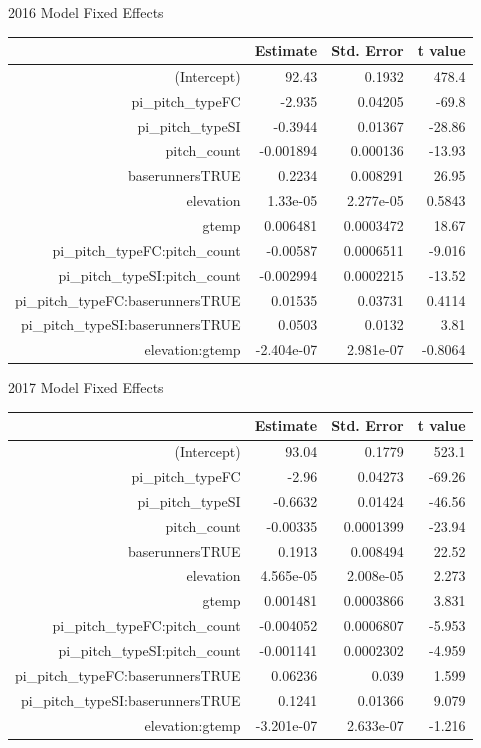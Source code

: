 \documentclass[letterpaper,12pt]{article}\usepackage[]{graphicx}\usepackage[]{color}
\begin{document}
2016 Model Fixed Effects
\begin{table}[ht]
\centering
\begin{tabular}{rrrr}
  \hline
 & Estimate & Std. Error & t value \\ 
  \hline
(Intercept) & 92.43 & 0.1932 & 478.4 \\ 
  pi\_pitch\_typeFC & -2.935 & 0.04205 & -69.8 \\ 
  pi\_pitch\_typeSI & -0.3944 & 0.01367 & -28.86 \\ 
  pitch\_count & -0.001894 & 0.000136 & -13.93 \\ 
  baserunnersTRUE & 0.2234 & 0.008291 & 26.95 \\ 
  elevation & 1.33e-05 & 2.277e-05 & 0.5843 \\ 
  gtemp & 0.006481 & 0.0003472 & 18.67 \\ 
  pi\_pitch\_typeFC:pitch\_count & -0.00587 & 0.0006511 & -9.016 \\ 
  pi\_pitch\_typeSI:pitch\_count & -0.002994 & 0.0002215 & -13.52 \\ 
  pi\_pitch\_typeFC:baserunnersTRUE & 0.01535 & 0.03731 & 0.4114 \\ 
  pi\_pitch\_typeSI:baserunnersTRUE & 0.0503 & 0.0132 &  3.81 \\ 
  elevation:gtemp & -2.404e-07 & 2.981e-07 & -0.8064 \\ 
   \hline
\end{tabular}
\end{table}

2017 Model Fixed Effects
\begin{table}[ht]
\centering
\begin{tabular}{rrrr}
  \hline
 & Estimate & Std. Error & t value \\ 
  \hline
(Intercept) & 93.04 & 0.1779 & 523.1 \\ 
  pi\_pitch\_typeFC & -2.96 & 0.04273 & -69.26 \\ 
  pi\_pitch\_typeSI & -0.6632 & 0.01424 & -46.56 \\ 
  pitch\_count & -0.00335 & 0.0001399 & -23.94 \\ 
  baserunnersTRUE & 0.1913 & 0.008494 & 22.52 \\ 
  elevation & 4.565e-05 & 2.008e-05 & 2.273 \\ 
  gtemp & 0.001481 & 0.0003866 & 3.831 \\ 
  pi\_pitch\_typeFC:pitch\_count & -0.004052 & 0.0006807 & -5.953 \\ 
  pi\_pitch\_typeSI:pitch\_count & -0.001141 & 0.0002302 & -4.959 \\ 
  pi\_pitch\_typeFC:baserunnersTRUE & 0.06236 & 0.039 & 1.599 \\ 
  pi\_pitch\_typeSI:baserunnersTRUE & 0.1241 & 0.01366 & 9.079 \\ 
  elevation:gtemp & -3.201e-07 & 2.633e-07 & -1.216 \\ 
   \hline
\end{tabular}
\end{table}




\newpage
%

\label{lastpage}
\end{document}
